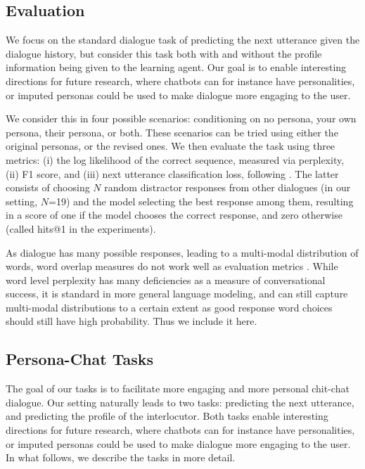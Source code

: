 \documentclass[11pt,a4paper]{article}
\begin{document}
\subsection{Evaluation}

We focus on the standard dialogue task of predicting the next utterance given the dialogue history, but consider this task both with and without the profile information being given to the learning agent. Our goal is to enable interesting directions for future research, where chatbots can for instance have personalities, or imputed personas could be used to make dialogue more engaging to the user.

We consider this in four possible scenarios: conditioning on no persona, your own persona, their persona, or both. These scenarios can be tried using either the original personas, or the revised ones.
We then evaluate the task using three metrics: (i) the log likelihood of the correct sequence, measured via perplexity, (ii) F1 score, and (iii) 
next utterance classification loss, following .
The latter consists of choosing $N$ random distractor responses from other dialogues (in our setting, $N$=19) and the model selecting the best response among them, resulting in a score of one if the model chooses the correct response, and zero otherwise (called hits@1 in the experiments). 

As dialogue has many possible responses, leading to a multi-modal distribution of words, word overlap measures do not work well as evaluation metrics \citep{liu2016not,serban2015survey}.
While word level perplexity has many deficiencies as a measure of conversational success, it is standard in more general language modeling, 
and can still capture multi-modal distributions to a certain extent as 
good response word choices should still have high probability.
Thus we include it here.
\fi

\subsection{Persona-Chat Tasks}

The goal of our tasks is to facilitate more engaging and more personal chit-chat dialogue. Our setting naturally leads to two tasks: predicting the next utterance, and predicting the profile of the interlocutor. Both tasks enable interesting directions for future research, where chatbots can for instance have personalities, or imputed personas could be used to make dialogue more engaging to the user. In what follows, we describe the tasks in more detail.
\end{document}
